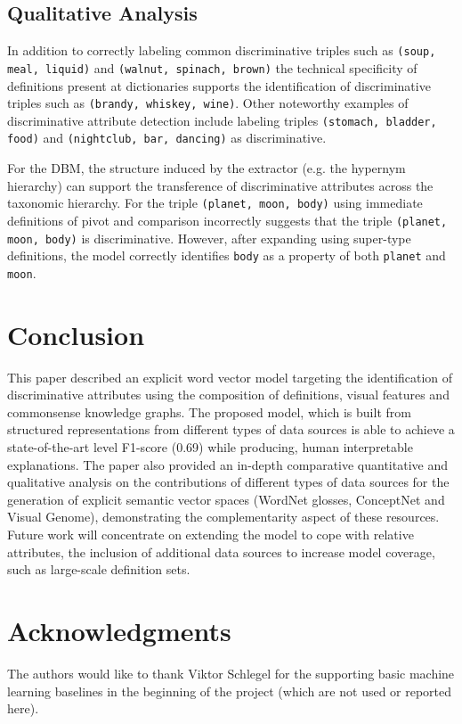 \documentclass[11pt,a4paper]{article}
\begin{document}
\subsection{Qualitative Analysis}

In addition to correctly labeling common discriminative triples such as
\texttt{(soup, meal, liquid)} and \texttt{(walnut, spinach, brown)} the technical specificity of definitions present at dictionaries supports the identification of discriminative triples such as \texttt{(brandy, whiskey, wine)}. Other noteworthy examples of discriminative attribute detection include labeling triples \texttt{(stomach, bladder, food)} and \texttt{(nightclub, bar, dancing)} as discriminative. 



For the DBM, the structure induced by the extractor (e.g. the hypernym hierarchy) can support the transference of discriminative attributes across the taxonomic hierarchy. For the triple \texttt{(planet, moon, body)} using immediate definitions of pivot and comparison incorrectly suggests that the triple \texttt{(planet, moon, body)} is discriminative. However, after expanding using super-type definitions, the model correctly identifies \texttt{body} as a property of both \texttt{planet} and \texttt{moon}.








\section{Conclusion}
\label{sec:con}

This paper described an explicit word vector model targeting the identification of discriminative attributes using the composition of definitions, visual features and commonsense knowledge graphs. The proposed model, which is built from structured representations from different types of data sources is able to achieve a state-of-the-art level F1-score (0.69) while producing, human interpretable explanations. The paper also provided an in-depth comparative quantitative and qualitative analysis on the contributions of different types of data sources for the generation of explicit semantic vector spaces (WordNet glosses, ConceptNet and Visual Genome), demonstrating the complementarity aspect of these resources. Future work will concentrate on extending the model to cope with relative attributes, the inclusion of additional data sources to increase model coverage, such as large-scale definition sets.   
 
\section*{Acknowledgments} The authors would like to thank Viktor Schlegel for the supporting basic machine learning baselines in the beginning of the project (which are not used or reported here). 




\appendix
\end{document}
